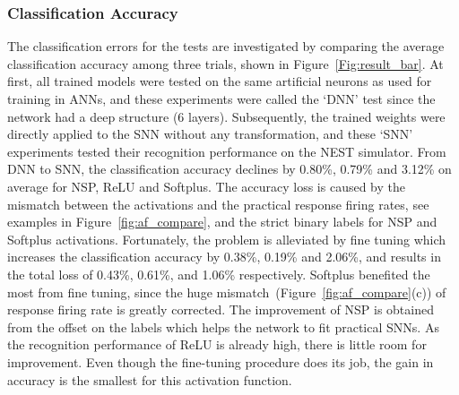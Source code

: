 	\subsubsection{Classification Accuracy}
	The classification errors for the tests are investigated by comparing the average classification accuracy among three trials, shown in Figure~\ref{Fig:result_bar}.
	At first, all trained models were tested on the same artificial neurons as used for training in ANNs, and these experiments were called the `DNN' test since the network had a deep structure (6 layers).
	Subsequently, the trained weights were directly applied to the SNN without any transformation, and these `SNN' experiments tested their recognition performance on the NEST simulator.
	From DNN to SNN, the classification accuracy declines by 0.80\%, 0.79\% and 3.12\% on average for NSP, ReLU and Softplus.
	The accuracy loss is caused by the mismatch between the activations and the practical response firing rates, see examples in Figure~\ref{fig:af_compare}, and the strict binary labels for NSP and Softplus activations.
	Fortunately, the problem is alleviated by fine tuning which increases the classification accuracy by 0.38\%, 0.19\% and 2.06\%, and results in the total loss of 0.43\%, 0.61\%, and 1.06\% respectively.
	Softplus benefited the most from fine tuning, since the huge mismatch~(Figure~\ref{fig:af_compare}(c)) of response firing rate is greatly corrected.
	The improvement of NSP is obtained from the offset on the labels which helps the network to fit practical SNNs.
	As the recognition performance of ReLU is already high, there is little room for improvement.
	Even though the fine-tuning procedure does its job, the gain in accuracy is the smallest for this activation function.
	
	
	
	
